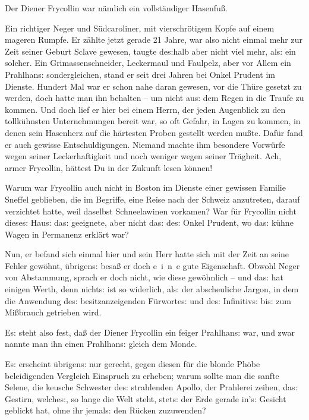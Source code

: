 \documentclass[oneside,12pt]{book}
\newcommand{\s}{s:}
\begin{document}
Der Diener Frycollin war n\"amlich ein vollst\"andiger Hasenfu{\ss}.

Ein richtiger Neger und S\"udcaroliner, mit vierschr\"otigem Kopfe
auf einem mageren Rumpfe. Er z\"ahlte jetzt gerade 21 Jahre, war also
nicht einmal mehr zur Zeit seiner Geburt Sclave gewesen, taugte
de{\s}halb aber nicht viel mehr, al{\s} ein solcher. Ein
Grimassenschneider, Leckermaul und Faulpelz, aber vor Allem ein
Prahlhan{\s} sondergleichen, stand er seit drei Jahren bei Onkel
Prudent im Dienste. Hundert Mal war er schon nahe daran gewesen, vor
die Th\"ure gesetzt zu werden, doch hatte man ihn behalten -- um
nicht au{\s} dem Regen in die Traufe zu kommen. Und doch lief er hier
bei einem Herrn, der jeden Augenblick zu den tollk\"uhnsten
Unternehmungen bereit war, so oft Gefahr, in Lagen zu kommen, in
denen sein Hasenherz auf die h\"artesten Proben gestellt werden
mu{\ss}te. Daf\"ur fand er auch gewisse Entschuldigungen. Niemand
machte ihm besondere Vorw\"urfe wegen seiner Leckerhaftigkeit und
noch weniger wegen seiner Tr\"agheit. Ach, armer Frycollin, h\"attest
Du in der Zukunft lesen k\"onnen!

Warum war Frycollin auch nicht in Boston im Dienste einer gewissen
Familie Sneffel geblieben, die im Begriffe, eine Reise nach der
Schweiz anzutreten, darauf verzichtet hatte, weil daselbst
Schneelawinen vorkamen? War f\"ur Frycollin nicht diese{\s} Hau{\s}
da{\s} geeignete, aber nicht da{\s} de{\s} Onkel Prudent, wo da{\s}
k\"uhne Wagen in Permanenz erkl\"art war?

Nun, er befand sich einmal hier und sein Herr hatte sich mit der Zeit
an seine Fehler gew\"ohnt, \"ubrigen{\s} besa{\ss} er doch e~i~n~e
gute Eigenschaft. Obwohl Neger von Abstammung, sprach er doch nicht,
wie diese gew\"ohnlich -- und da{\s} hat einigen Werth, denn
nicht{\s} ist so widerlich, al{\s} der abscheuliche Jargon, in dem
die Anwendung de{\s} besitzanzeigenden F\"urworte{\s} und de{\s}
Infinitiv{\s} bi{\s} zum Mi{\ss}brauch getrieben wird.

E{\s} steht also fest, da{\ss} der Diener Frycollin ein feiger
Prahlhan{\s} war, und zwar nannte man ihn einen {\glqq}Prahlhan{\s}
gleich dem Monde{\grqq}.

E{\s} erscheint \"ubrigen{\s} nur gerecht, gegen diesen f\"ur die
blonde Ph\"obe beleidigenden Vergleich Einspruch zu erheben; warum
sollte man die sanfte Selene, die keusche Schwester de{\s}
strahlenden Apollo, der Prahlerei zeihen, da{\s} Gestirn, welche{\s},
so lange die Welt steht, stet{\s} der Erde gerade in'{\s} Gesicht
geblickt hat, ohne ihr jemal{\s} den R\"ucken zuzuwenden?
\end{document}
